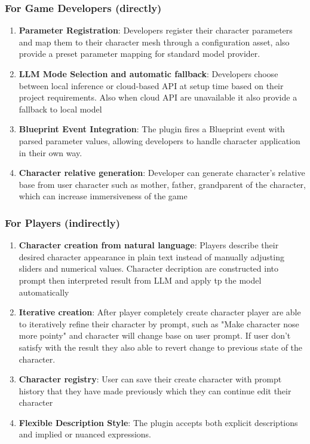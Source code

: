 \subsubsection{For Game Developers (directly)}
\begin{enumerate}    
    \item \textbf{Parameter Registration}: Developers register their character parameters and map them to their character mesh through a configuration asset, also provide a preset parameter mapping for standard model provider.
    
    \item \textbf{LLM Mode Selection and automatic fallback}: Developers choose between local inference or cloud-based API at setup time based on their project requirements. Also when cloud API are unavailable it also provide a fallback to local model
        
    \item \textbf{Blueprint Event Integration}: The plugin fires a Blueprint event with parsed parameter values, allowing developers to handle character application in their own way.
    
    \item \textbf{Character relative generation}: Developer can generate character's relative base from user character such as mother, father, grandparent of the character, which can increase immersiveness of the game
\end{enumerate}

\subsubsection{For Players (indirectly)}
\begin{enumerate}

    \item \textbf{Character creation from natural language}: Players describe their desired character appearance in plain text instead of manually adjusting sliders and numerical values. Character decription are constructed into prompt then interpreted result from LLM and apply tp the model automatically

    \item \textbf{Iterative creation}: After player completely create character player are able to iteratively refine their character by prompt, such as "Make character nose more pointy" and character will change base on user prompt. If user don't satisfy with the result they also able to revert change to previous state of the character.

    \item  \textbf{Character registry}: User can save their create character with prompt history that they have made previously which they can continue edit their character 

    \item \textbf{Flexible Description Style}: The plugin accepts both explicit descriptions and implied or nuanced expressions.
\end{enumerate}

